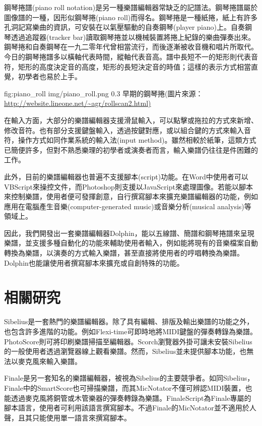 \documentclass[12pt,a4paper,oneside]{report}
\begin{document}
鋼琴捲譜(piano roll notation)是另一種樂譜編輯器常缺乏的記譜法。鋼琴捲譜屬於圖像譜的一種，因形似鋼琴捲(piano roll)而得名。鋼琴捲是一種紙捲，紙上有許多孔洞記寫樂曲的資訊，可安裝在以氣壓驅動的自奏鋼琴(player piano)上。自奏鋼琴透過追蹤器(tracker bar)讀取鋼琴捲並以機械裝置將捲上紀錄的樂曲彈奏出來。鋼琴捲和自奏鋼琴在一九二零年代曾相當流行，而後逐漸被收音機和唱片所取代\cite{thePiano}。今日的鋼琴捲譜多以橫軸代表時間，縱軸代表音高。譜中長短不一的矩形則代表音符，矩形的高度決定音的高度，矩形的長短決定音的時值；這樣的表示方式相當直覺，初學者也易於上手。

\figurewithcaption
{fig:piano_roll}
{img/piano_roll.png}
{0.3}
{早期的鋼琴捲(圖片來源：\url{http://website.lineone.net/~agr/rollscan2.html)}}

在輸入方面，大部分的樂譜編輯器支援滑鼠輸入，可以點擊或拖拉的方式來新增、修改音符。也有部分支援鍵盤輸入，透過按鍵對應，或以組合鍵的方式來輸入音符，操作方式如同作業系統的輸入法(input method)。雖然相較於紙筆，這類方式已簡便許多，但對不熟悉樂理的初學者或演奏者而言，輸入樂譜仍往往是件困難的工作。

此外，目前的樂譜編輯器也普遍不支援腳本(script)功能。在Word中使用者可以VBScript來操控文件，而Photoshop則支援以JavaScript來處理圖像。若能以腳本來控制樂譜，使用者便可發揮創意，自行撰寫腳本來擴充樂譜編輯器的功能，例如應用在電腦產生音樂(computer-generated music)或音樂分析(musical analysis)等領域上。

因此，我們開發出一套樂譜編輯器Dolphin，能以五線譜、簡譜和鋼琴捲譜來呈現樂譜，並支援多種自動化的功能來輔助使用者輸入，例如能將現有的音樂檔案自動轉換為樂譜，以演奏的方式輸入樂譜，甚至直接將使用者的哼唱轉換為樂譜。Dolphin也能讓使用者撰寫腳本來擴充或自創特殊的功能。

\section{相關研究} %

Sibelius\cite{sibelius}是一套熱門的樂譜編輯器。除了具有編輯、排版及輸出樂譜的功能之外，也包含許多進階的功能。例如Flexi-time可即時地將MIDI鍵盤的彈奏轉錄為樂譜。PhotoScore則可將印刷樂譜掃描至編輯器。Scorch瀏覽器外掛可讓未安裝Sibelius的一般使用者透過瀏覽器線上觀看樂譜。然而，Sibelius並未提供腳本功能，也無法以麥克風來輸入樂譜。

Finale\cite{finale2009}是另一套知名的樂譜編輯器，被視為Sibelius的主要競爭者。如同Sibelius，Finale中的SmartScore也可掃描樂譜，而其MicNotator不僅可辨認MIDI裝置，也能透過麥克風將銅管或木管樂器的彈奏轉錄為樂譜。FinaleScript為Finale專屬的腳本語言，使用者可利用該語言撰寫腳本。不過Finale的MicNotator並不適用於人聲，且其只能使用單一語言來撰寫腳本。
\end{document}
